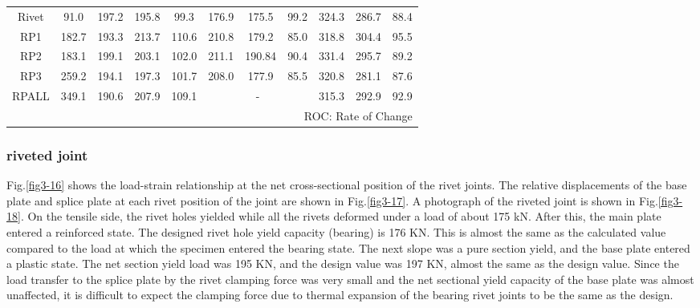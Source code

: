 \begin{table}[ht]
{\begin{tabular}{@{}ccccccccccc@{}}
    Rivet                 & 91.0                  & 197.2     & 195.8     & 99.3      & 176.9       & 175.5        & 99.2       & 324.3       & 286.7       & 88.4      \\
    RP1                   & 182.7                 & 193.3     & 213.7     & 110.6     & 210.8       & 179.2        & 85.0       & 318.8       & 304.4       & 95.5      \\
    RP2                   & 183.1                 & 199.1     & 203.1     & 102.0     & 211.1       & 190.84       & 90.4       & 331.4       & 295.7       & 89.2      \\
    RP3                   & 259.2                 & 194.1     & 197.3     & 101.7     & 208.0       & 177.9        & 85.5       & 320.8       & 281.1       & 87.6      \\
    RPALL                 & 349.1                 & 190.6     & 207.9     & 109.1     & \multicolumn{3}{c}{-}                   & 315.3       & 292.9       & 92.9      \\ \midrule
    \multicolumn{11}{r}{ROC: Rate of Change}                                                                                                                           
    \end{tabular}}
\end{table}

\subsubsection{riveted joint}

Fig.\ref{fig3-16} shows the load-strain relationship at the net cross-sectional position of the rivet joints. The relative displacements of the base plate and splice plate at each rivet position of the joint are shown in Fig.\ref{fig3-17}. A photograph of the riveted joint is shown in Fig.\ref{fig3-18}. On the tensile side, the rivet holes yielded while all the rivets deformed under a load of about 175 kN. After this, the main plate entered a reinforced state. The designed rivet hole yield capacity (bearing) is 176 KN. This is almost the same as the calculated value compared to the load at which the specimen entered the bearing state. The next slope was a pure section yield, and the base plate entered a plastic state. The net section yield load was 195 KN, and the design value was 197 KN, almost the same as the design value. Since the load transfer to the splice plate by the rivet clamping force was very small and the net sectional yield capacity of the base plate was almost unaffected, it is difficult to expect the clamping force due to thermal expansion of the bearing rivet joints to be the same as the design.

